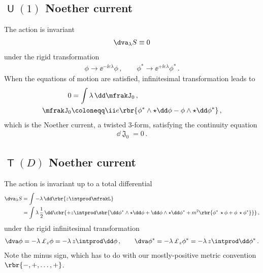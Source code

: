 \documentclass[a4paper]{article}
\begin{document}
\subsection[$U(1)$ Noether current]{$\msansU(1)$ Noether current}


The action is invariant
\begin{align}
\dva_{\lambda} S \equiv 0
\end{align}
under the rigid transformation
\begin{align}
\phi \to \ee^{-\ii e \lambda} \phi\,,\qquad
\phi^* \to \ee^{+\ii e \lambda} \phi^*\,.
\end{align}
When the equations of motion are satisfied, infinitesimal 
transformation leads to
\begin{align}
0 &= \int \lambda\, \dd \mfrakJ_0\,,
\nonumber \\
\mfrakJ_0 &\coloneqq \ii e\rbr{\phi^*\wedge\star\dd\phi
	- \phi\wedge\star\dd\phi^*}\,,
\end{align}
which is the Noether current, a twisted $3$-form, satisfying the continuity 
equation
\begin{align}
\dd \mfrakJ_0 = 0\,.
\end{align}

\subsection[$T(D)$ Noether current]{$\msansT(D)$ Noether current}

The action is invariant up to a total differential
\begin{align}
\dva_{\lambda} S &= \int - \lambda\,\dd\rbr{z \intprod \mfrakL}
\nonumber \\
&= \int \lambda\,\frac{1}{2}\,\dd\cbr{
	+ z\intprod\sbr{\dd\phi^*\wedge\star\dd\phi +
	\dd\phi\wedge\star\dd\phi^* +
	m^2\rbr{\phi^*\,\star\phi
	+\phi\,\star\phi^*}}}\,,
\label{eq:tot-dif-ckg-10}
\end{align}
under the rigid infinitesimal transformation
\begin{align}
\dva\phi = -\lambda\, \pounds_z \phi = -\lambda\, z \intprod \dd \phi\,,\qquad
\dva\phi^* = -\lambda\, \pounds_z \phi^* = -\lambda\, z \intprod \dd \phi^*\,.
\end{align}
Note the minus sign, which has to do with our mostly-positive metric convention 
$\rbr{-, +, \ldots, +}$.
\end{document}
